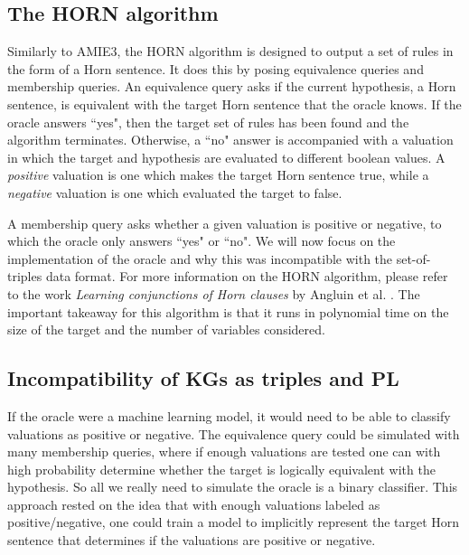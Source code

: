 \subsection{The HORN algorithm}
Similarly to AMIE3, the HORN algorithm is designed to output a set of rules in the form of a Horn sentence. It does this by posing equivalence queries and membership queries. An equivalence query asks if the current hypothesis, a Horn sentence, is equivalent with the target Horn sentence that the oracle knows. If the oracle answers ``yes", then the target set of rules has been found and the algorithm terminates. Otherwise, a ``no" answer is accompanied with a valuation in which the target and hypothesis are evaluated to different boolean values. A \textit{positive} valuation is one which makes the target Horn sentence true, while a \textit{negative} valuation is one which evaluated the target to false. %

A membership query asks whether a given valuation is positive or negative, to which the oracle only answers ``yes" or ``no". We will now focus on the implementation of the oracle and why this was incompatible with the set-of-triples data format. For more information on the HORN algorithm, please refer to the work \textit{Learning conjunctions of Horn clauses} by Angluin et al. \cite{DBLP:journals/ml/AngluinFP92}. The important takeaway for this algorithm is that it runs in polynomial time on the size of the target and the number of variables considered.


\subsection{Incompatibility of KGs as triples and PL}
If the oracle were a machine learning model, it would need to be able to classify valuations as positive or negative. The equivalence query could be simulated with many membership queries, where if enough valuations are tested one can with high probability determine whether the target is logically equivalent with the hypothesis. So all we really need to simulate the oracle is a binary classifier. This approach rested on the idea that with enough valuations labeled as positive/negative, one could train a model to implicitly represent the target Horn sentence that determines if the valuations are positive or negative. 

